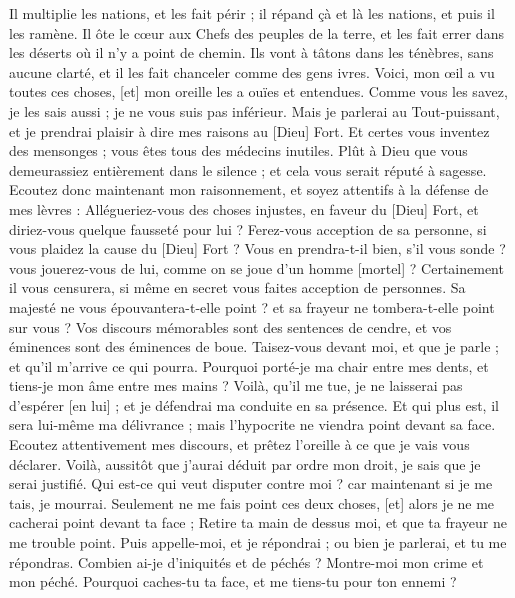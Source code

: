 \begin{multicols}{2}
Il multiplie les nations, et les fait périr ; il répand çà et là les nations, et puis il les ramène.
Il ôte le cœur aux Chefs des peuples de la terre, et les fait errer dans les déserts où il n'y a point de chemin.
Ils vont à tâtons dans les ténèbres, sans aucune clarté, et il les fait chanceler comme des gens ivres.
\VerseOne{}Voici, mon œil a vu toutes ces choses, [et] mon oreille les a ouïes et entendues.
Comme vous les savez, je les sais aussi ; je ne vous suis pas inférieur.
Mais je parlerai au Tout-puissant, et je prendrai plaisir à dire mes raisons au [Dieu] Fort.
Et certes vous inventez des mensonges ; vous êtes tous des médecins inutiles.
Plût à Dieu que vous demeurassiez entièrement dans le silence ; et cela vous serait réputé à sagesse.
Ecoutez donc maintenant mon raisonnement, et soyez attentifs à la défense de mes lèvres :
Allégueriez-vous des choses injustes, en faveur du [Dieu] Fort, et diriez-vous quelque fausseté pour lui ?
Ferez-vous acception de sa personne, si vous plaidez la cause du [Dieu] Fort ?
Vous en prendra-t-il bien, s'il vous sonde ? vous jouerez-vous de lui, comme on se joue d'un homme [mortel] ?
Certainement il vous censurera, si même en secret vous faites acception de personnes.
Sa majesté ne vous épouvantera-t-elle point ? et sa frayeur ne tombera-t-elle point sur vous ?
Vos discours mémorables sont des sentences de cendre, et vos éminences sont des éminences de boue.
Taisez-vous devant moi, et que je parle ; et qu'il m'arrive ce qui pourra.
Pourquoi porté-je ma chair entre mes dents, et tiens-je mon âme entre mes mains ?
Voilà, qu'il me tue, je ne laisserai pas d'espérer [en lui] ; et je défendrai ma conduite en sa présence.
Et qui plus est, il sera lui-même ma délivrance ; mais l'hypocrite ne viendra point devant sa face.
Ecoutez attentivement mes discours, et prêtez l'oreille à ce que je vais vous déclarer.
Voilà, aussitôt que j'aurai déduit par ordre mon droit, je sais que je serai justifié.
Qui est-ce qui veut disputer contre moi ? car maintenant si je me tais, je mourrai.
Seulement ne me fais point ces deux choses, [et] alors je ne me cacherai point devant ta face ;
Retire ta main de dessus moi, et que ta frayeur ne me trouble point.
Puis appelle-moi, et je répondrai ; ou bien je parlerai, et tu me répondras.
Combien ai-je d'iniquités et de péchés ? Montre-moi mon crime et mon péché.
Pourquoi caches-tu ta face, et me tiens-tu pour ton ennemi ?

\end{multicols}
